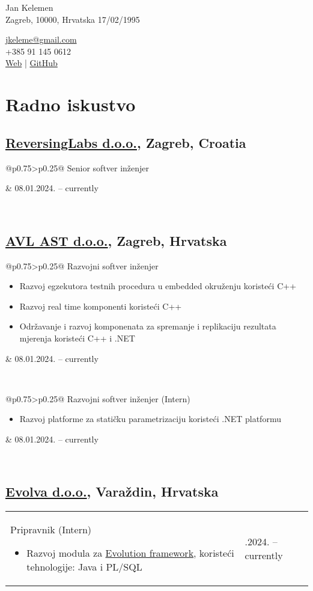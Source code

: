 \documentclass[a4paper]{article}
\makeatletter
\newlength{\tablewidth}
\newenvironment{period}[2]{%
\newcommand{\sarma}{#2}%
\setlength{\tablewidth}{\linewidth}
\addtolength{\tablewidth}{-2\tabcolsep}
\begin{tabular}{@{}p{0.75\tablewidth}>{\raggedleft\arraybackslash}p{0.25\tablewidth}@{}}%
#1 \newline
\begin{itemize}
}{%
\end{itemize} & \sarma \\%
\end{tabular}\\
}
\makeatother
\begin{document}
\fontfamily{\sfdefault}
\selectfont

\begin{minipage}{.5\textwidth}
\LARGE{Jan Kelemen}\\
\normalsize{Zagreb, 10000, Hrvatska}
\normalsize{17/02/1995}
\end{minipage}%
\begin{minipage}{.5\textwidth}
\raggedleft
\href{mailto:jkeleme@gmail.com}{jkeleme@gmail.com} \\
+385 91 145 0612 \\
\href{http://jan-kelemen.github.io/}{Web} | \href{https://github.com/jan-kelemen}{GitHub}
\end{minipage}

\vspace{1em}

\section{Radno iskustvo}
\subsection{\href{https://www.reversinglabs.com/}{ReversingLabs d.o.o.}, Zagreb, Croatia}
\begin{period}{Senior softver in\v{z}enjer}{08.01.2024. -- currently}
\end{period}
\subsection{\href{https://www.avl.com/}{AVL AST d.o.o.}, Zagreb, Hrvatska}
\begin{period}{Razvojni softver in\v{z}enjer}{01.08.2018. -- 31.12.2023.}
        \item
                Razvoj egzekutora testnih procedura u embedded okru\v{z}enju koriste\'{c}i C++
        \item
                Razvoj real time komponenti koriste\'{c}i C++
        \item
                Odr\v{z}avanje i razvoj komponenata za spremanje i replikaciju rezultata mjerenja koriste\'{c}i C++ i .NET
\end{period}
\begin{period}{Razvojni softver in\v{z}enjer (Intern)}{17.07.2017. -- 31.07.2018.}
	\item
		Razvoj platforme za stati\v{c}ku parametrizaciju koriste\'{c}i .NET platformu
\end{period}
\subsection{\href{http://www.evolva.hr/hr/index.html}{Evolva d.o.o.}, Vara\v{z}din, Hrvatska}
\begin{period}{Pripravnik (Intern)}{22.08.2016. -- 23.09.2016.}
	\item
		Razvoj modula za \href{http://www.evolution-framework.com/}{Evolution framework}, koriste\'{c}i tehnologije: Java i PL/SQL
\end{period}
\end{document}
